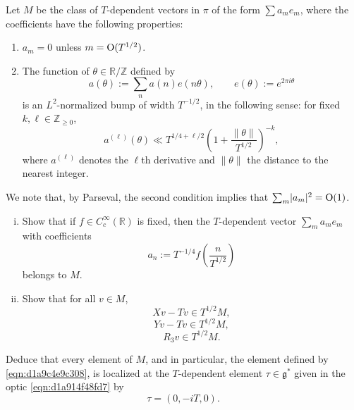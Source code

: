 \documentclass[reqno]{amsart} 
\numberwithin{equation}{section}
\begin{document}
\begin{exercise}\label{exercise:d1a94c55524c}
  Let $M$ be the class of $T$-dependent vectors in $\pi$ of the form $\sum a_m e_m$, where the coefficients have the following properties:
  \begin{enumerate}
  \item $a_m = 0$ unless $m = \operatorname{O}(T^{1/2})$.
  \item The function of $\theta \in \mathbb{R} / \mathbb{Z}$ defined by
    \begin{equation*}
      a(\theta) := \sum_n a(n) e (n \theta), \qquad
      e(\theta) := e^{2 \pi i \theta }      
    \end{equation*}
    is an $L^2$-normalized bump of width $T^{-1/2}$, in the following sense: for fixed $k , \ell \in \mathbb{Z}_{\geq 0}$,
    \begin{equation}\label{eqn:d1a9c4e68198}
      a^{(\ell)}(\theta) \ll
      T^{1/4 + \ell/2} \left( 1+ \frac{\lVert \theta  \rVert}{T^{1/2}} \right)^{-k},
    \end{equation}
    where $a^{(\ell)}$ denotes the $\ell$th derivative and $\lVert \theta \rVert$ the distance to the nearest integer.
  \end{enumerate}
  We note that, by Parseval, the second condition implies that $\sum_m \lvert a_m \rvert^2 = \operatorname{O}(1)$.
  \begin{enumerate}[(i)]
  \item Show that if $f \in C_c^\infty(\mathbb{R})$ is fixed, then the $T$-dependent vector $\sum_m a_m e_m$ with coefficients
    \begin{equation}\label{eqn:d1a9c4e9c308}
      a_n := T^{-1/4} f\left( \frac{n}{T^{1/2}} \right)
    \end{equation}
    belongs to $M$.
  \item Show that for all $v \in M$,
    \begin{equation*}
      X v - T v \in T^{1/2} M,
    \end{equation*}
    \begin{equation*}
      Y v - T v \in T^{1/2} M,
    \end{equation*}
    \begin{equation*}
      R_3 v \in T^{1/2} M.
    \end{equation*}
  \end{enumerate}
  Deduce that every element of $M$, and in particular, the element defined by \eqref{eqn:d1a9c4e9c308}, is localized at the $T$-dependent element $\tau \in \mathfrak{g}^*$ given in the optic \eqref{eqn:d1a914f48fd7} by
  \begin{equation*}
    \tau = (0,-iT,0).
  \end{equation*}
\end{exercise}
\end{document}
